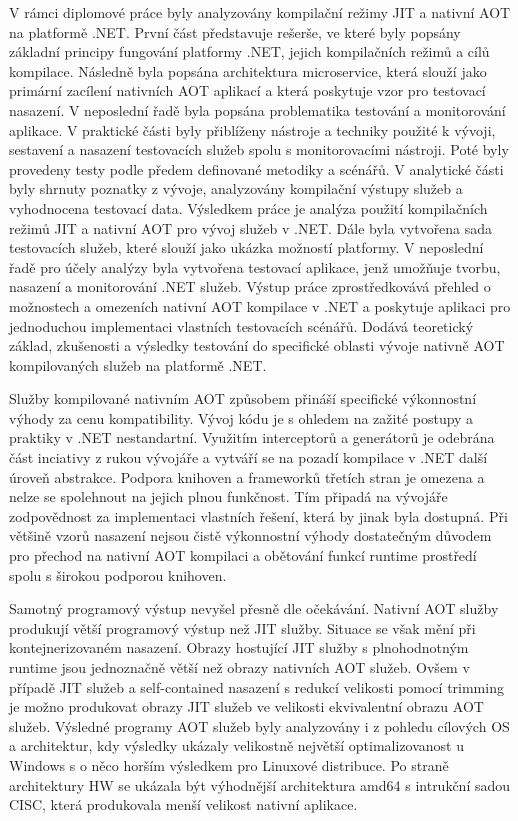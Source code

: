 
V rámci diplomové práce byly analyzovány kompilační režimy JIT a nativní AOT na platformě .NET. První část představuje rešerše, ve které byly popsány základní principy fungování platformy .NET, jejich kompilačních režimů a cílů kompilace. Následně byla popsána architektura microservice, která slouží jako primární zacílení nativních AOT aplikací a která poskytuje vzor pro testovací nasazení. V neposlední řadě byla popsána problematika testování a monitorování aplikace. V praktické části byly přiblíženy nástroje a techniky použité k vývoji, sestavení a nasazení testovacích služeb spolu s monitorovacími nástroji. Poté byly provedeny testy podle předem definované metodiky a scénářů. V analytické části byly shrnuty poznatky z vývoje, analyzovány kompilační výstupy služeb a vyhodnocena testovací data. Výsledkem práce je analýza použití kompilačních režimů JIT a nativní AOT pro vývoj služeb v .NET. Dále byla vytvořena sada testovacích služeb, které slouží jako ukázka možností platformy. V neposlední řadě pro účely analýzy byla vytvořena testovací aplikace, jenž umožňuje tvorbu, nasazení a monitorování .NET služeb. Výstup práce zprostředkovává přehled o možnostech a omezeních nativní AOT kompilace v .NET a poskytuje aplikaci pro jednoduchou implementaci vlastních testovacích scénářů. Dodává teoretický základ, zkušenosti a výsledky testování do specifické oblasti vývoje nativně AOT kompilovaných služeb na platformě .NET.

Služby kompilované nativním AOT způsobem přináší specifické výkonnostní výhody za cenu kompatibility. Vývoj kódu je s ohledem na zažité postupy a praktiky v .NET nestandartní. Využitím interceptorů a generátorů je odebrána část inciativy z rukou vývojáře a vytváří se na pozadí kompilace v .NET další úroveň abstrakce. Podpora knihoven a frameworků třetích stran je omezena a nelze se spolehnout na jejich plnou funkčnost. Tím připadá na vývojáře zodpovědnost za implementaci vlastních řešení, která by jinak byla dostupná. Při většině vzorů nasazení nejsou čistě výkonnostní výhody dostatečným důvodem pro přechod na nativní AOT kompilaci a obětování funkcí runtime prostředí spolu s širokou podporou knihoven.

Samotný programový výstup nevyšel přesně dle očekávání. Nativní AOT služby produkují větší programový výstup než JIT služby. Situace se však mění při kontejnerizovaném nasazení. Obrazy hostující JIT služby s plnohodnotným runtime jsou jednoznačně větší než obrazy nativních AOT služeb. Ovšem v případě JIT služeb a self-contained nasazení s redukcí velikosti pomocí trimming je možno produkovat obrazy JIT služeb ve velikosti ekvivalentní obrazu AOT služeb. Výsledné programy AOT služeb byly analyzovány i z pohledu cílových OS a architektur, kdy výsledky ukázaly velikostně největší optimalizovanost u Windows s o něco horším výsledkem pro Linuxové distribuce. Po straně architektury HW se ukázala být výhodnější architektura amd64 s intrukční sadou CISC, která produkovala menší velikost nativní aplikace.


